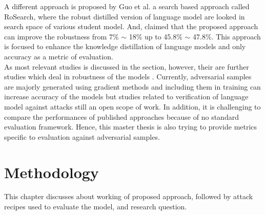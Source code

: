 \documentclass[%
	BCOR=8mm, %
	DIV=12,
	toc=bibliography, %
	toc=listof, %
	oneside, %
	egregdoesnotlikesansseriftitles, %
	]{scrbook}
\begin{document}
A different approach is proposed by Guo et al. \cite{guo_rosearch_2021} a search based approach called RoSearch, where the robust distilled version of language model are looked in search space of various student model. And, claimed that the proposed approach can improve the robustness from 7\% $\sim$ 18\% up to 45.8\% $\sim$ 47.8\%. This approach is focused to enhance the knowledge distillation of language models and only accuracy as a metric of evaluation.\\
As most relevant studies is discussed in the section, however, their are further studies which deal in robustness of the models \cite{wang_infobert_2020, shi_robustness_2020,jones_robust_2020,jiang_smart_2020,malkiel_mml_2019,liu_transfer_2019}.
Currently, adversarial samples are majorly generated using gradient methods and including them in training can increase accuracy of the models but studies related to verification of language model against attacks still an open scope of work. In addition, it is challenging to compare the performances of published approaches \cite{moradi_evaluating_2021} because of no standard evaluation framework. Hence, this master thesis is also trying to provide metrics specific to evaluation against adversarial samples.


\chapter{ Methodology}
\label{chapter:methodology}
This chapter discusses about working of proposed approach, followed by attack recipes used to evaluate the model, and research question.
\end{document}
